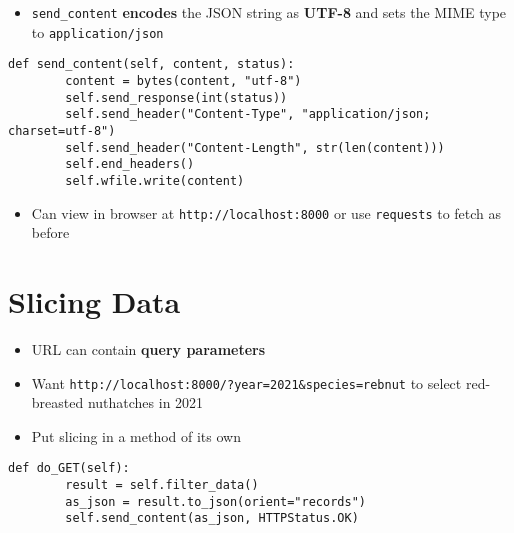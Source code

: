 \documentclass[krantzl]{krantz}
\newcommand{\glossref}[1]{\textbf{#1}}
\begin{document}
\begin{itemize}
\item \texttt{send\_content} \glossref{encodes} the JSON string as \glossref{UTF-8}
    and sets the MIME type to \texttt{application/json}

\end{itemize}
\begin{lstlisting}[frame=tblr]
    def send_content(self, content, status):
        content = bytes(content, "utf-8")
        self.send_response(int(status))
        self.send_header("Content-Type", "application/json; charset=utf-8")
        self.send_header("Content-Length", str(len(content)))
        self.end_headers()
        self.wfile.write(content)
\end{lstlisting}

\begin{itemize}
\item Can view in browser at \texttt{http://localhost:8000} or use \texttt{requests} to fetch as before

\end{itemize}
\section{Slicing Data}
\begin{itemize}
\item URL can contain \glossref{query parameters}

\item Want \texttt{http://localhost:8000/?year=2021\&species=rebnut} to select red-breasted nuthatches in 2021

\item Put slicing in a method of its own

\end{itemize}
\begin{lstlisting}[frame=tblr]
    def do_GET(self):
        result = self.filter_data()
        as_json = result.to_json(orient="records")
        self.send_content(as_json, HTTPStatus.OK)
\end{lstlisting}
\end{document}
